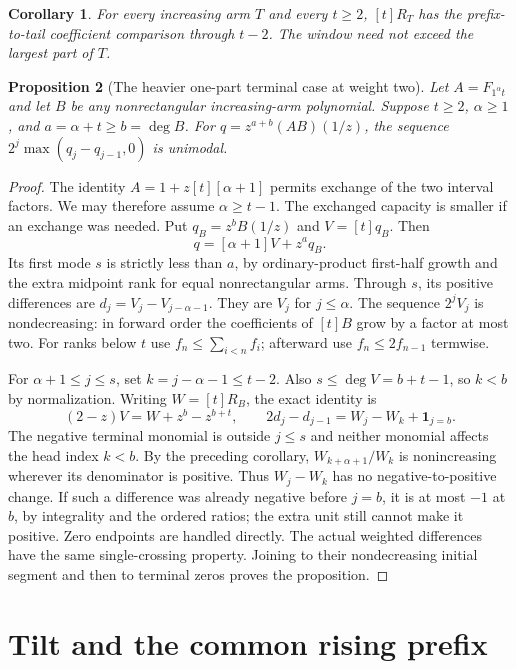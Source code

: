 \documentclass[11pt]{article}
\newtheorem{proposition}{Proposition}[section]
\newtheorem{corollary}[proposition]{Corollary}
\begin{document}
\begin{corollary}\label{cor:deficit-window-ratios}
For every increasing arm $T$ and every $t\ge2$, $[t]R_T$
has the prefix-to-tail coefficient comparison through $t-2$.
The window need not exceed the largest part of $T$.
\end{corollary}

\begin{proposition}[The heavier one-part terminal case at weight two]
Let $A=F_{1^\alpha t}$ and let $B$ be any nonrectangular
increasing-arm polynomial. Suppose $t\ge2$, $\alpha\ge1$,
and $a=\alpha+t\ge b=\deg B$. For $q=z^{a+b}(AB)(1/z)$,
the sequence $2^j\max(q_j-q_{j-1},0)$ is unimodal.
\end{proposition}
\begin{proof}
The identity $A=1+z[t][\alpha+1]$ permits exchange of the
two interval factors. We may therefore assume $\alpha\ge t-1$.
The exchanged capacity is smaller if an exchange was needed.
Put $q_B=z^bB(1/z)$ and $V=[t]q_B$. Then
\[
 q=[\alpha+1]V+z^a q_B.
\]
Its first mode $s$ is strictly less than $a$, by ordinary-product
first-half growth and the extra midpoint rank for equal nonrectangular
arms. Through $s$, its positive differences are
$d_j=V_j-V_{j-\alpha-1}$. They are $V_j$ for $j\le\alpha$.
The sequence $2^jV_j$ is nondecreasing: in forward order the
coefficients of $[t]B$ grow by a factor at most two. For ranks
below $t$ use $f_n\le\sum_{i<n}f_i$; afterward use
$f_n\le2f_{n-1}$ termwise.

For $\alpha+1\le j\le s$, set $k=j-\alpha-1\le t-2$.
Also $s\le\deg V=b+t-1$, so $k<b$ by normalization.
Writing $W=[t]R_B$, the exact identity is
\[
 (2-z)V=W+z^b-z^{b+t},\qquad
 2d_j-d_{j-1}=W_j-W_k+\mathbf1_{j=b}.
\]
The negative terminal monomial is outside $j\le s$ and neither
monomial affects the head index $k<b$. By the preceding corollary,
$W_{k+\alpha+1}/W_k$ is nonincreasing wherever its denominator
is positive. Thus $W_j-W_k$ has no negative-to-positive change.
If such a difference was already negative before $j=b$, it is
at most $-1$ at $b$, by integrality and the ordered ratios; the
extra unit still cannot make it positive. Zero endpoints are
handled directly. The actual weighted differences have the same
single-crossing property. Joining to their nondecreasing initial
segment and then to terminal zeros proves the proposition.
\end{proof}

\section{Tilt and the common rising prefix}
\end{document}
